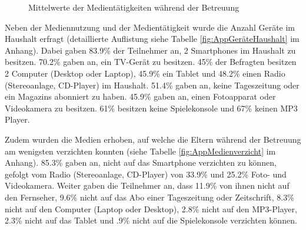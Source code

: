 \begin{figure}%
\caption{Mittelwerte der Medientätigkeiten während der Betreuung}\label{fig:Medientätigkeit}
{}
\end{figure}

Neben der Mediennutzung und der Medientätigkeit wurde die Anzahl Geräte im Haushalt erfragt (detaillierte Auflistung siehe Tabelle \ref{fig:AppGeräteHaushalt} im Anhang). Dabei gaben 83.9\% der Teilnehmer an, 2 Smartphones im Haushalt zu besitzen. 70.2\% gaben an, ein TV-Gerät zu besitzen. 45\% der Befragten besitzen 2 Computer (Desktop oder Laptop), 45.9\% ein Tablet und 48.2\% einen Radio (Stereoanlage, CD-Player) im Haushalt. 51.4\% gaben an, keine Tageszeitung oder ein Magazins abonniert zu haben. 45.9\% gaben an, einen Fotoapparat oder Videokamera zu besitzen. 61\% besitzen keine Spielekonsole und 67\% keinen MP3 Player.

Zudem wurden die Medien erhoben, auf welche die Eltern während der Betreuung am wenigsten verzichten konnten (siehe Tabelle \ref{fig:AppMedienverzicht} im Anhang). 85.3\% gaben an, nicht auf das Smartphone verzichten zu können, gefolgt vom Radio (Stereoanlage, CD-Player) von 33.9\% und 25.2\% Foto- und Videokamera. Weiter gaben die Teilnehmer an, dass 11.9\% von ihnen nicht auf den Fernseher, 9.6\% nicht auf das Abo einer Tageszeitung oder Zeitschrift, 8.3\% nicht auf den Computer (Laptop oder Desktop), 2.8\% nicht auf den MP3-Player, 2.3\% nicht auf das Tablet und .9\% nicht auf die Spielekonsole verzichten können.


